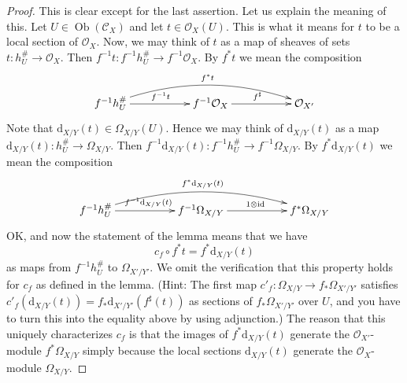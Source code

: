\documentclass[10pt,a4paper]{amsart}
\theoremstyle{plain}
\theoremstyle{definition}
\theoremstyle{remark}
\numberwithin{equation}{subsection}
\def\Ob{\mathop{\mathrm{Ob}}\nolimits}
\begin{document}
\begin{proof}
This is clear except for the last assertion. Let us explain the meaning of
this. Let $U \in \Ob(\mathcal{C}_X)$ and let $t \in \mathcal{O}_X(U)$.
This is what it means for $t$ to be a local section of $\mathcal{O}_X$.
Now, we may think of $t$ as a map of sheaves of sets
$t : h_U^\# \to \mathcal{O}_X$. Then
$f^{-1}t : f^{-1}h_U^\# \to f^{-1}\mathcal{O}_X$. By $f^*t$ we mean
the composition
$$
\xymatrix{
f^{-1}h_U^\# \ar[rr]^{f^{-1}t} \ar@/^4ex/[rrrr]^{f^*t} & &
f^{-1}\mathcal{O}_X \ar[rr]^{f^\sharp} & &
\mathcal{O}_{X'}
}
$$
Note that $\text{d}_{X/Y}(t) \in \Omega_{X/Y}(U)$. Hence we may think of
$\text{d}_{X/Y}(t)$ as a map $\text{d}_{X/Y}(t) : h_U^\# \to \Omega_{X/Y}$.
Then $f^{-1}\text{d}_{X/Y}(t) : f^{-1}h_U^\# \to f^{-1}\Omega_{X/Y}$.
By $f^*\text{d}_{X/Y}(t)$ we mean the composition
$$
\xymatrix{
f^{-1}h_U^\#
\ar[rr]^{f^{-1}\text{d}_{X/Y}(t)}
\ar@/^4ex/[rrrr]^{f^*\text{d}_{X/Y}(t)} & &
f^{-1}\Omega_{X/Y} \ar[rr]^{1 \otimes \text{id}} & &
f^*\Omega_{X/Y}
}
$$
OK, and now the statement of the lemma means that we have
$$
c_f \circ f^*t = f^*\text{d}_{X/Y}(t)
$$
as maps from $f^{-1}h_U^\#$ to $\Omega_{X'/Y'}$. We omit the verification
that this property holds for $c_f$ as defined in the lemma. (Hint: The first
map $c'_f : \Omega_{X/Y} \to f_*\Omega_{X'/Y'}$ satisfies
$c'_f(\text{d}_{X/Y}(t)) = f_*\text{d}_{X'/Y'}(f^\sharp(t))$ as sections of
$f_*\Omega_{X'/Y'}$ over $U$, and you have to
turn this into the equality above by using adjunction.)
The reason that this uniquely characterizes $c_f$ is that the images
of $f^*\text{d}_{X/Y}(t)$ generate the $\mathcal{O}_{X'}$-module
$f^*\Omega_{X/Y}$ simply because the local sections $\text{d}_{X/Y}(t)$
generate the $\mathcal{O}_X$-module $\Omega_{X/Y}$.
\end{proof}
\end{document}
